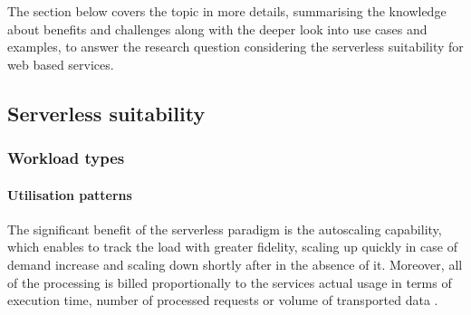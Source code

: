 The section below covers the topic in more details, summarising the knowledge about benefits and challenges along with the deeper look into use cases and examples, to answer the research question considering the serverless suitability for web based services.



\subsection{Serverless suitability}

\subsubsection{Workload types}

\paragraph{Utilisation patterns} \label{chapter:serverless-suitability-utilisation-patterns}

The significant benefit of the serverless paradigm is the autoscaling capability, which enables to track the load with greater fidelity, scaling up quickly in case of demand increase and scaling down shortly after in the absence of it.
Moreover, all of the processing is billed proportionally to the services actual usage in terms of execution time, number of processed requests or volume of transported data \cite{BerkeleyServerless}.

